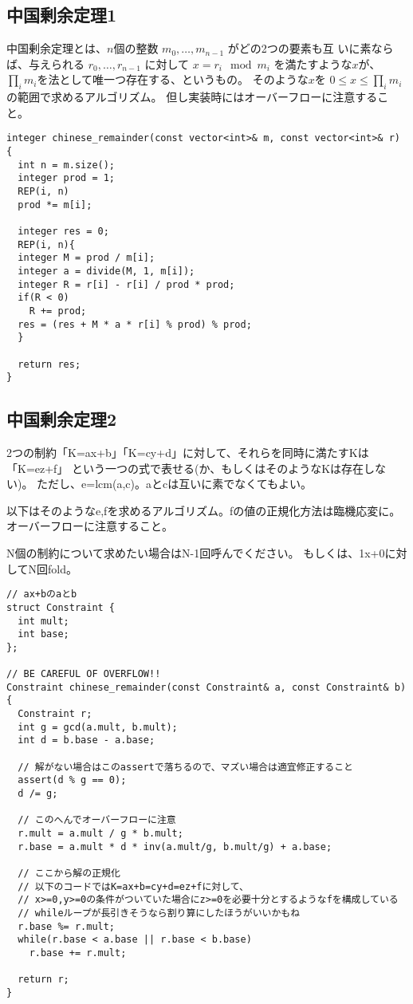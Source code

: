 \subsection{中国剰余定理1}

中国剰余定理とは、$n$個の整数 $m_0, \dots, m_{n-1}$ がどの2つの要素も互
いに素ならば、与えられる $r_0, \dots, r_{n-1}$ に対して
 $x = r_i \mod m_i$ を満たすような$x$が、$\prod_i m_i$を法として唯一つ存在する、というもの。
そのような$x$を $ 0 \leq x \leq \prod_i m_i$ の範囲で求めるアルゴリズム。
但し実装時にはオーバーフローに注意すること。

\begin{lstlisting}
integer chinese_remainder(const vector<int>& m, const vector<int>& r) {
  int n = m.size();
  integer prod = 1;
  REP(i, n)
  prod *= m[i];

  integer res = 0;
  REP(i, n){
  integer M = prod / m[i];
  integer a = divide(M, 1, m[i]);
  integer R = r[i] - r[i] / prod * prod;
  if(R < 0)
    R += prod;
  res = (res + M * a * r[i] % prod) % prod;
  }
  
  return res;
}
\end{lstlisting}



\subsection{中国剰余定理2}

2つの制約「K=ax+b」「K=cy+d」に対して、それらを同時に満たすKは「K=ez+f」
という一つの式で表せる(か、もしくはそのようなKは存在しない)。
ただし、e=lcm(a,c)。aとcは互いに素でなくてもよい。

以下はそのようなe,fを求めるアルゴリズム。fの値の正規化方法は臨機応変に。
オーバーフローに注意すること。

N個の制約について求めたい場合はN-1回呼んでください。
もしくは、1x+0に対してN回fold。


\begin{lstlisting}
// ax+bのaとb
struct Constraint {
  int mult;
  int base;
};
 
// BE CAREFUL OF OVERFLOW!!
Constraint chinese_remainder(const Constraint& a, const Constraint& b) {
  Constraint r;
  int g = gcd(a.mult, b.mult);
  int d = b.base - a.base;
 
  // 解がない場合はこのassertで落ちるので、マズい場合は適宜修正すること
  assert(d % g == 0);
  d /= g;
 
  // このへんでオーバーフローに注意
  r.mult = a.mult / g * b.mult;
  r.base = a.mult * d * inv(a.mult/g, b.mult/g) + a.base;
 
  // ここから解の正規化
  // 以下のコードではK=ax+b=cy+d=ez+fに対して、
  // x>=0,y>=0の条件がついていた場合にz>=0を必要十分とするようなfを構成している
  // whileループが長引きそうなら割り算にしたほうがいいかもね
  r.base %= r.mult;
  while(r.base < a.base || r.base < b.base)
    r.base += r.mult;
 
  return r;
}
\end{lstlisting}


